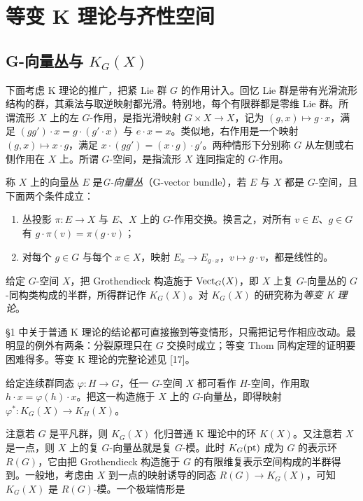\section{等变 K 理论与齐性空间}
\subsection{G-向量丛与 $K_G(X)$}

下面考虑 K 理论的推广，把紧 Lie 群 $G$ 的作用计入。回忆 Lie 群是带有光滑流形结构的群，其乘法与取逆映射都光滑。特别地，每个有限群都是零维 Lie 群。所谓流形 $X$ 上的左 $G$-作用，是指光滑映射 $G\times X\to X$，记为 $(g,x)\mapsto g\cdot x$，满足 $(gg')\cdot x=g\cdot(g'\cdot x)$ 与 $e\cdot x=x$。类似地，右作用是一个映射 $(g,x)\mapsto x\cdot g$，满足 $x\cdot(gg')=(x\cdot g)\cdot g'$。两种情形下分别称 $G$ 从左侧或右侧作用在 $X$ 上。所谓 $G$-空间，是指流形 $X$ 连同指定的 $G$-作用。

\begin{definition}
称 $X$ 上的向量丛 $E$ 是\emph{G-向量丛}（G-vector bundle），若 $E$ 与 $X$ 都是 $G$-空间，且下面两个条件成立：
\begin{enumerate}[label=\arabic*.,leftmargin=2.2em]
\item 丛投影 $\pi:E\to X$ 与 $E$、$X$ 上的 $G$-作用交换。换言之，对所有 $v\in E$、$g\in G$ 有 $g\cdot\pi(v)=\pi(g\cdot v)$；
\item 对每个 $g\in G$ 与每个 $x\in X$，映射 $E_x\to E_{g\cdot x}$，$v\mapsto g\cdot v$，都是线性的。
\end{enumerate}
\end{definition}

\begin{definition}
给定 $G$-空间 $X$，把 Grothendieck 构造施于 $\operatorname{Vect}_G(X)$，即 $X$ 上复 $G$-向量丛的 $G$-同构类构成的半群，所得群记作 $K_G(X)$。对 $K_G(X)$ 的研究称为\emph{等变 K 理论}。
\end{definition}

§1 中关于普通 K 理论的结论都可直接搬到等变情形，只需把记号作相应改动。最明显的例外有两条：分裂原理只在 $G$ 交换时成立；等变 Thom 同构定理的证明要困难得多。等变 K 理论的完整论述见 [17]。

\begin{definition}
给定连续群同态 $\varphi:H\to G$，任一 $G$-空间 $X$ 都可看作 $H$-空间，作用取 $h\cdot x=\varphi(h)\cdot x$。把这一构造施于 $X$ 上的 $G$-向量丛，即得映射 $\varphi^*:K_G(X)\to K_H(X)$。
\end{definition}

注意若 $G$ 是平凡群，则 $K_G(X)$ 化归普通 K 理论中的环 $K(X)$。又注意若 $X$ 是一点，则 $X$ 上的复 $G$-向量丛就是复 $G$-模。此时 $K_G(\mathrm{pt})$ 成为 $G$ 的表示环 $R(G)$，它由把 Grothendieck 构造施于 $G$ 的有限维复表示空间构成的半群得到。一般地，考虑由 $X$ 到一点的映射诱导的同态 $R(G)\to K_G(X)$，可知 $K_G(X)$ 是 $R(G)$-模。一个极端情形是


